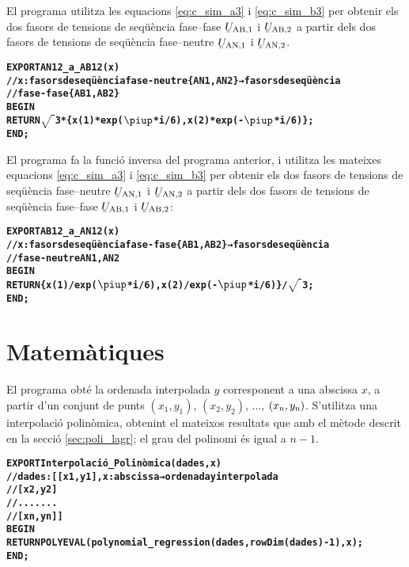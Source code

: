 El programa  utilitza les equacions  \eqref{eq:c_sim_a3} i \eqref{eq:c_sim_b3} per obtenir els dos fasors de tensions de seqüència fase--fase $\cmplx{U}\ped{AB,1}$ i  $\cmplx{U}\ped{AB,2}$ a partir dels dos fasors de tensions de seqüència fase--neutre $\cmplx{U}\ped{AN,1}$ i $\cmplx{U}\ped{AN,2}$.
\pagebreak
\begin{alltt}
\bfseries
{}
    EXPORT AN12_a_AB12(x)
    // x:fasors de seqüència fase-neutre \{AN1,AN2\} → fasors de seqüència
    // fase-fase \{AB1,AB2\}
    BEGIN
      RETURN \(\sqrt{\phantom{|}}\)3*\{x(1)*exp(\(\piup\)*i/6),x(2)*exp(-\(\piup\)*i/6)\};
    END;
\end{alltt}

El programa  fa la funció inversa del programa anterior, i utilitza les mateixes equacions  \eqref{eq:c_sim_a3} i \eqref{eq:c_sim_b3} per obtenir els dos fasors de tensions de seqüència fase--neutre $\cmplx{U}\ped{AN,1}$ i $\cmplx{U}\ped{AN,2}$ a partir dels dos fasors de tensions de seqüència fase--fase $\cmplx{U}\ped{AB,1}$ i  $\cmplx{U}\ped{AB,2}$:
\vspace{-1cm}
\begin{alltt}
\bfseries
{}
    EXPORT AB12_a_AN12(x)
    // x:fasors de seqüència fase-fase \{AB1,AB2\} → fasors de seqüència
    // fase-neutre {AN1,AN2}
    BEGIN
      RETURN \{x(1)/exp(\(\piup\)*i/6),x(2)/exp(-\(\piup\)*i/6)\}/\(\sqrt{\phantom{|}}\)3;
    END;
\end{alltt}


\section{Matemàtiques}

El programa  obté la ordenada interpolada $y$ corresponent a una abscissa $x$, a partir d'un conjunt  de punts $(x_1,y_1)$, $(x_2,y_2)$, ..., $(x_\mathrm{n},y_\mathrm{n})$. S'utilitza una interpolació polinòmica, obtenint el mateixos resultats que amb el mètode descrit en la secció \vref{sec:poli_lagr}; el grau del polinomi és igual a $n-1$.
\vspace{-1cm}
\begin{alltt}
\bfseries
{}
    EXPORT Interpolació_Polinòmica(dades,x)
    // dades:[[x1,y1], x:abscissa → ordenada y interpolada
    //        [x2,y2]
    //        .......
    //        [xn,yn]]
    BEGIN
      RETURN POLYEVAL(polynomial_regression(dades,rowDim(dades)-1),x);
    END;
\end{alltt}


